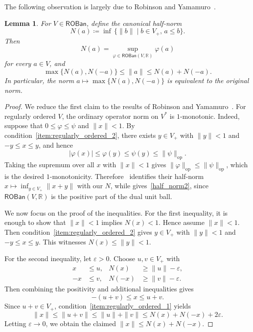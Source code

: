 \documentclass[11pt,onecolumn]{article}
\newcommand{\R}{\mathbb{R}}
\newcommand{\ROBan}{\mathsf{ROBan}}
\theoremstyle{plain}
\newtheorem{lem}[lem]{Lemma}
\theoremstyle{remark}
\theoremstyle{definition}
\begin{document}
The following observation is largely due to Robinson and Yamamuro~\cite{RobinsonYamamuro}.

\begin{lem}
	\label{roban_half_norm}
	For $V \in \ROBan$, define the canonical half-norm
	\[
		N(a) \coloneqq \inf \, \{ \|b\| \mid b \in V_+,\, a \le b \}.
	\]
	Then
	\begin{equation}
		\label{half_norm2}
		N(a) = \sup_{\varphi \in \ROBan(V,\R)} \varphi(a)
	\end{equation}
	for every $a \in V$, and
	\[
		\max\{N(a), N(-a)\} \le \|a\| \le N(a) + N(-a).
	\]
	In particular, the norm $a \mapsto \max\{N(a),N(-a)\}$ is equivalent to the original norm.
\end{lem}

\begin{proof}
	We reduce the first claim to the results of Robinson and Yamamuro~\cite{RobinsonYamamuro}.
	For regularly ordered $V$, the ordinary operator norm on $V^*$ is $1$-monotonic.
	Indeed, suppose that $0\le\varphi\le\psi$ and $\|x\|<1$.
	By condition~\ref{item:regularly_ordered_2}, there exists $y\in V_+$ with $\|y\|<1$ and $-y\le x\le y$, and hence
	\[
		|\varphi(x)|\le\varphi(y)\le\psi(y)\le\|\psi\|_{\mathrm{op}}.
	\]
	Taking the supremum over all $x$ with $\|x\|<1$ gives $\|\varphi\|_{\mathrm{op}}\le\|\psi\|_{\mathrm{op}}$, which is the desired $1$-monotonicity.
	Therefore~\cite[Theorem~2.4]{RobinsonYamamuro} identifies their half-norm $x\mapsto\inf_{y\in V_+}\|x+y\|$ with our $N$,
	while \cite[Theorem~2.1]{RobinsonYamamuro} gives~\eqref{half_norm2}, since $\ROBan(V,\R)$ is the positive part of the dual unit ball.

	We now focus on the proof of the inequalities.
	For the first inequality, it is enough to show that $\|x\| < 1$ implies $N(x) < 1$.
	Hence assume $\|x\| < 1$.
	Then condition~\ref{item:regularly_ordered_2} gives $y \in V_+$ with $\|y\| < 1$ and $-y \le x \le y$.
	This witnesses $N(x) \le \|y\| < 1$.

	For the second inequality, let $\varepsilon > 0$.
	Choose $u,v \in V_+$ with
	\begin{align*}
		x & \le u, & N(x) & \ge \|u\| - \varepsilon, \\[2pt]
		-x & \le v, & N(-x) & \ge \|v\| - \varepsilon.
	\end{align*}
	Then combining the positivity and additional inequalities gives
	\[
		-(u+v) \le x \le u+v.
	\]
	Since $u+v \in V_+$, condition~\ref{item:regularly_ordered_1} yields
	\[
		\|x\| \le \|u+v\| \le \|u\| + \|v\| \le N(x) + N(-x) + 2\varepsilon.
	\]
	Letting $\varepsilon \to 0$, we obtain the claimed $\|x\| \le N(x) + N(-x)$.
	\qedhere
\end{proof}
\end{document}
